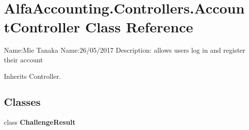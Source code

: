 \hypertarget{class_alfa_accounting_1_1_controllers_1_1_account_controller}{}\section{Alfa\+Accounting.\+Controllers.\+Account\+Controller Class Reference}
\label{class_alfa_accounting_1_1_controllers_1_1_account_controller}


Name\+:Mie Tanaka Name\+:26/05/2017 Description\+: allows users log in and register their account  




Inherits Controller.

\subsection*{Classes}
\begin{DoxyCompactItemize}
\item 
class {\bfseries Challenge\+Result}
\end{DoxyCompactItemize}
